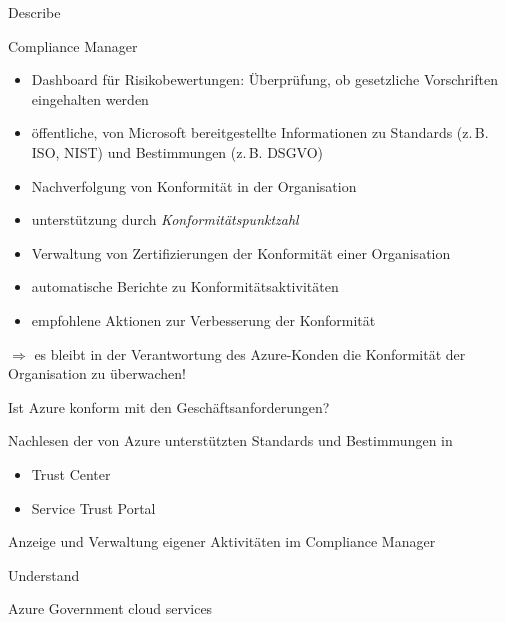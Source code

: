 \documentclass{scrartcl}
\newenvironment{flashcard}[2][]{%
    #1
    \vfill
    \centerline{\Large{#2}}
    \vfill
\newpage
}
{\newpage}
\begin{document}
    \begin{flashcard}[Describe]{Compliance Manager}
        \begin{itemize}
            \item Dashboard für Risikobewertungen:\newline
            Überprüfung, ob gesetzliche Vorschriften eingehalten werden
            \item öffentliche, von Microsoft bereitgestellte Informationen zu Standards (z.\,B. ISO, NIST) und Bestimmungen (z.\,B. DSGVO)
            \item Nachverfolgung von Konformität in der Organisation
            \item unterstützung durch \emph{Konformitätspunktzahl}
            \item Verwaltung von Zertifizierungen der Konformität einer Organisation
            \item automatische Berichte zu Konformitätsaktivitäten
            \item empfohlene Aktionen zur Verbesserung der Konformität
        \end{itemize}
        
        $\Rightarrow$ es bleibt in der Verantwortung des Azure-Konden die Konformität der Organisation zu überwachen!
    \end{flashcard}

    \begin{flashcard}[]{Ist Azure konform mit den Geschäftsanforderungen?}
        Nachlesen der von Azure unterstützten Standards und Bestimmungen in
        \begin{itemize}
            \item Trust Center
            \item Service Trust Portal
        \end{itemize}
        
        \vspace{5mm}
        Anzeige und Verwaltung eigener Aktivitäten im Compliance Manager
    \end{flashcard}

    \begin{flashcard}[Understand]{Azure Government cloud services}

    \end{flashcard}
\end{document}
